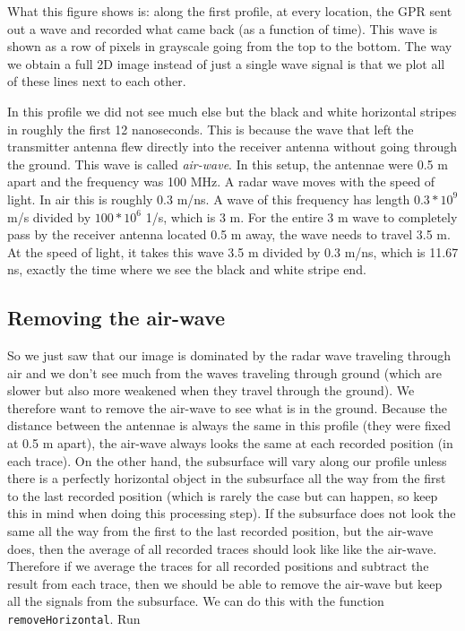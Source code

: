 \documentclass[11pt]{article}
\begin{document}
What this figure shows is: along the first profile, at every location,
the GPR sent out a wave and recorded what came back (as a function of
time). This wave is shown as a row of pixels in grayscale going from
the top to the bottom. The way we obtain a full 2D image instead of
just a single wave signal is that we plot all of these lines next to
each other.

In this profile we did not see much else but the black and white
horizontal stripes in roughly the first 12 nanoseconds. This is
because the wave that left the transmitter antenna flew directly into
the receiver antenna without going through the ground. This wave is
called \emph{air-wave}. In this setup, the antennae were 0.5 m apart
and the frequency was 100 MHz. A radar wave moves with the speed of
light. In air this is roughly 0.3 m/ns. A wave of this frequency has
length $0.3*10^9$ m/s divided by $100*10^6$ 1/s, which is 3 m. For the
entire 3 m wave to completely pass by the receiver antenna located 0.5
m away, the wave needs to travel 3.5 m. At the speed of light, it takes this
wave 3.5 m divided by 0.3 m/ns, which is 11.67 ns, exactly the time
where we see the black and white stripe end.

\subsection{Removing the air-wave}

So we just saw that our image is dominated by the radar wave traveling
through air and we don't see much from the waves traveling through
ground (which are slower but also more weakened when they travel
through the ground). We therefore want to remove the air-wave to see
what is in the ground. Because the distance between the antennae is
always the same in this profile (they were fixed at 0.5 m apart), the
air-wave always looks the same at each recorded position (in each
trace). On the other hand, the subsurface will vary along our profile
unless there is a perfectly horizontal object in the subsurface all
the way from the first to the last recorded position (which is rarely
the case but can happen, so keep this in mind when doing this
processing step). If the subsurface does not look the same all the way
from the first to the last recorded position, but the air-wave does,
then the average of all recorded traces should look like like the
air-wave. Therefore if we average the traces for all recorded
positions and subtract the result from each trace, then we should be
able to remove the air-wave but keep all the signals from the
subsurface. We can do this with the function
\verb#removeHorizontal#. Run
\end{document}
